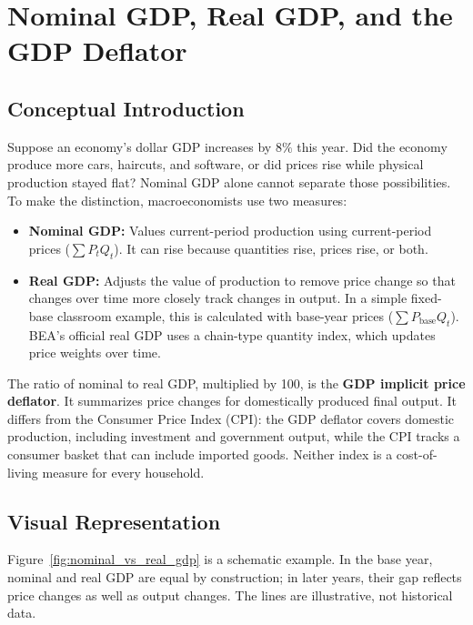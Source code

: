 \documentclass[11pt,letterpaper]{article}
\begin{document}
\section{Nominal GDP, Real GDP, and the GDP Deflator}

\subsection*{Conceptual Introduction}
Suppose an economy's dollar GDP increases by $8\%$ this year. Did the economy produce more cars, haircuts, and software, or did prices rise while physical production stayed flat? Nominal GDP alone cannot separate those possibilities. To make the distinction, macroeconomists use two measures:
\begin{itemize}
    \item \textbf{Nominal GDP:} Values current-period production using current-period prices ($\sum P_t Q_t$). It can rise because quantities rise, prices rise, or both.
    \item \textbf{Real GDP:} Adjusts the value of production to remove price change so that changes over time more closely track changes in output. In a simple fixed-base classroom example, this is calculated with base-year prices ($\sum P_{\text{base}}Q_t$). BEA's official real GDP uses a chain-type quantity index, which updates price weights over time.
\end{itemize}
The ratio of nominal to real GDP, multiplied by 100, is the \textbf{GDP implicit price deflator}. It summarizes price changes for domestically produced final output. It differs from the Consumer Price Index (CPI): the GDP deflator covers domestic production, including investment and government output, while the CPI tracks a consumer basket that can include imported goods. Neither index is a cost-of-living measure for every household.

\subsection*{Visual Representation}
Figure~\ref{fig:nominal_vs_real_gdp} is a schematic example. In the base year, nominal and real GDP are equal by construction; in later years, their gap reflects price changes as well as output changes. The lines are illustrative, not historical data.
\end{document}
